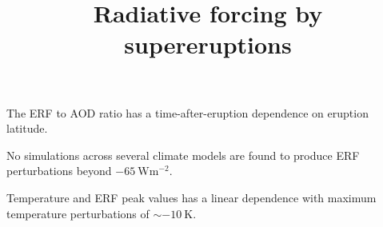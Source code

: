 \documentclass[draft]{agujournal2019}
\begin{document}
   


  \title{Radiative forcing by supereruptions}





  \begin{keypoints}
    \item
    The ERF to AOD ratio has a time-after-eruption dependence on eruption latitude.
    \item
    No simulations across several climate models are found to produce ERF perturbations
    beyond \(\SI{-65}{\watt\meter^{-2}}\).
    \item
    Temperature and ERF peak values has a linear dependence with maximum temperature
    perturbations of \(\sim \SI{-10}{\kelvin}\).

  \end{keypoints}
\end{document}
